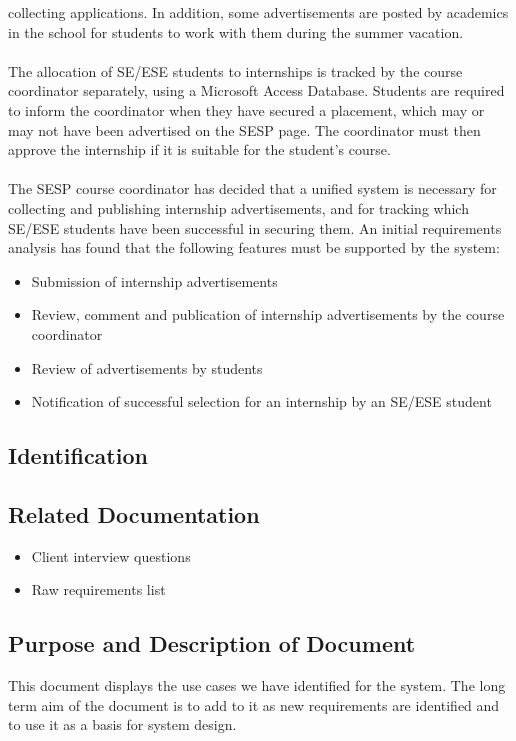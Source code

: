 \documentclass{l3deliverable}
\begin{document}
collecting applications. In addition, some advertisements are posted by academics in the school for
students to work with them during the summer vacation.\\
\\
The allocation of SE/ESE students to internships is tracked by the course coordinator separately,
using a Microsoft Access Database. Students are required to inform the coordinator when they have
secured a placement, which may or may not have been advertised on the SESP page. The coordinator
must then approve the internship if it is suitable for the student's course.\\
\\
The SESP course coordinator has decided that a unified system is necessary for collecting and
publishing internship advertisements, and for tracking which SE/ESE students have been successful
in securing them. An initial requirements analysis has found that the following features must be
supported by the system:
\begin{itemize}
\item{Submission of internship advertisements}
\item{Review, comment and publication of internship advertisements by the course coordinator}
\item{Review of advertisements by students}
\item{Notification of successful selection for an internship by an SE/ESE student}
\end{itemize}
\subsection{Identification}

\subsection{Related Documentation}
\begin{itemize}
\item{Client interview questions}
\item{Raw requirements list}
\end{itemize}

\subsection{Purpose and Description of Document}
This document displays the use cases we have identified for the system. The long term aim of the document is to add to it as new requirements are identified and to use it
as a basis for system design. 
\end{document}
